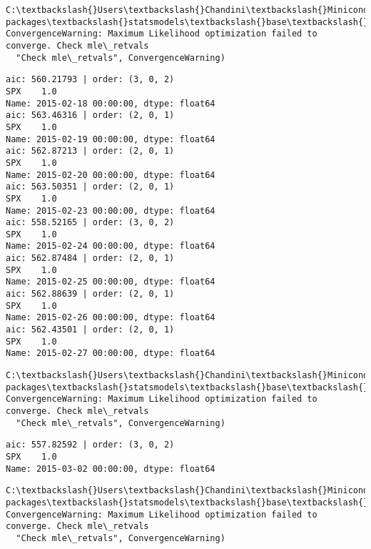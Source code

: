 \documentclass[11pt]{article}
\begin{document}
    \begin{Verbatim}[commandchars=\\\{\}]
C:\textbackslash{}Users\textbackslash{}Chandini\textbackslash{}Miniconda3\textbackslash{}envs\textbackslash{}auquan\textbackslash{}lib\textbackslash{}site-packages\textbackslash{}statsmodels\textbackslash{}base\textbackslash{}model.py:496: ConvergenceWarning: Maximum Likelihood optimization failed to converge. Check mle\_retvals
  "Check mle\_retvals", ConvergenceWarning)

    \end{Verbatim}

    \begin{Verbatim}[commandchars=\\\{\}]
aic: 560.21793 | order: (3, 0, 2)
SPX    1.0
Name: 2015-02-18 00:00:00, dtype: float64
aic: 563.46316 | order: (2, 0, 1)
SPX    1.0
Name: 2015-02-19 00:00:00, dtype: float64
aic: 562.87213 | order: (2, 0, 1)
SPX    1.0
Name: 2015-02-20 00:00:00, dtype: float64
aic: 563.50351 | order: (2, 0, 1)
SPX    1.0
Name: 2015-02-23 00:00:00, dtype: float64
aic: 558.52165 | order: (3, 0, 2)
SPX    1.0
Name: 2015-02-24 00:00:00, dtype: float64
aic: 562.87484 | order: (2, 0, 1)
SPX    1.0
Name: 2015-02-25 00:00:00, dtype: float64
aic: 562.88639 | order: (2, 0, 1)
SPX    1.0
Name: 2015-02-26 00:00:00, dtype: float64
aic: 562.43501 | order: (2, 0, 1)
SPX    1.0
Name: 2015-02-27 00:00:00, dtype: float64

    \end{Verbatim}

    \begin{Verbatim}[commandchars=\\\{\}]
C:\textbackslash{}Users\textbackslash{}Chandini\textbackslash{}Miniconda3\textbackslash{}envs\textbackslash{}auquan\textbackslash{}lib\textbackslash{}site-packages\textbackslash{}statsmodels\textbackslash{}base\textbackslash{}model.py:496: ConvergenceWarning: Maximum Likelihood optimization failed to converge. Check mle\_retvals
  "Check mle\_retvals", ConvergenceWarning)

    \end{Verbatim}

    \begin{Verbatim}[commandchars=\\\{\}]
aic: 557.82592 | order: (3, 0, 2)
SPX    1.0
Name: 2015-03-02 00:00:00, dtype: float64

    \end{Verbatim}

    \begin{Verbatim}[commandchars=\\\{\}]
C:\textbackslash{}Users\textbackslash{}Chandini\textbackslash{}Miniconda3\textbackslash{}envs\textbackslash{}auquan\textbackslash{}lib\textbackslash{}site-packages\textbackslash{}statsmodels\textbackslash{}base\textbackslash{}model.py:496: ConvergenceWarning: Maximum Likelihood optimization failed to converge. Check mle\_retvals
  "Check mle\_retvals", ConvergenceWarning)

    \end{Verbatim}
\end{document}
